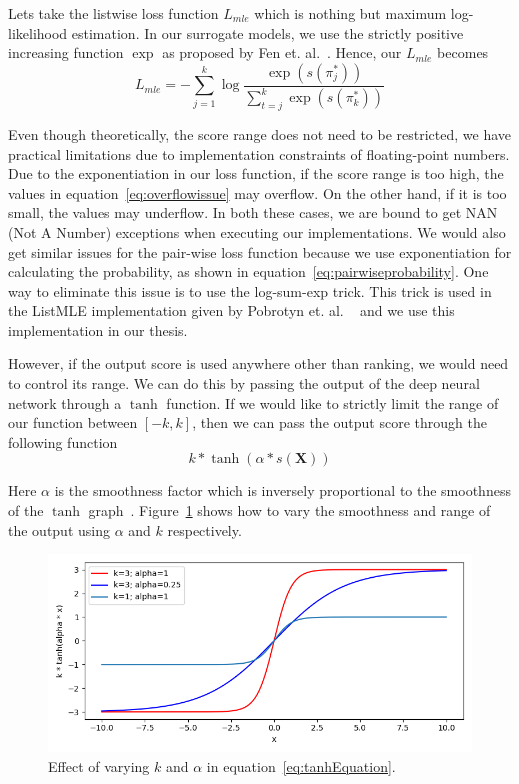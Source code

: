 \documentclass[12pt, twoside, ngerman]{report}
\begin{document}
Lets take the listwise loss function $L_{mle}$ which is nothing but maximum log-likelihood estimation. 
In our surrogate models, we use the strictly positive increasing function $\exp$ as proposed by Fen et. al.~\cite{listmlepaper}.
Hence, our $L_{mle}$ becomes 
\begin{equation}\label{eq:overflowissue}
L_{mle} = -  \sum\limits_{j=1}^{k} \log \frac{\exp(s(\pi^*_j))}{ \sum\limits_{t=j}^k \exp(s(\pi^*_k))}
\end{equation}

Even though theoretically, the score range does not need to be restricted, we have practical limitations due to implementation constraints of floating-point numbers.
Due to the exponentiation in our loss function, if the score range is too high,  the values in equation~\ref{eq:overflowissue} may overflow.
On the other hand, if it is too small, the values may underflow.
In both these cases, we are bound to get NAN (Not A Number) exceptions when executing our implementations.
We would also get similar issues for the pair-wise loss function because we use exponentiation for calculating the probability, as shown in equation~\ref{eq:pairwiseprobability}.
One way to eliminate this issue is to use the log-sum-exp trick. This trick is used in the ListMLE implementation given by Pobrotyn
 et. al. ~\cite{Pobrotyn2020ContextAwareLT} and we use this implementation in our thesis.

However, if the output score is used anywhere other than ranking, we would need to control its range.
We can do this by passing the output of the deep neural network through a $\tanh$ function.
If we would like to strictly limit the range of our function between $[-k,  k]$,  then we can pass the output score through the following function
\begin{equation}\label{eq:tanhEquation}
k * \tanh(\alpha * s(\textbf{X}))
\end{equation}

Here $\alpha$ is the smoothness factor which is inversely proportional to the smoothness of the $\tanh$ graph~\cite{tanhstackoverflowanswer}.
Figure~\ref{fig:tanhGraph} shows how to vary the smoothness and range of the output using $\alpha$ and $k$ respectively.

\begin{figure}[htb]
  \centering
    \includegraphics[scale=0.5]{images/tanhGraph}
    \caption{Effect of varying $k$ and $\alpha$ in equation~\ref{eq:tanhEquation}.}
    \label{fig:tanhGraph}
\end{figure}
\end{document}
